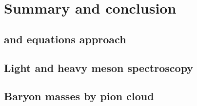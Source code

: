 \chapter{Summary and conclusion}
\label{chap:sum}

\section*{\DS and \BS equations approach}
\section*{Light and heavy meson spectroscopy}
\section*{Baryon masses by pion cloud}
